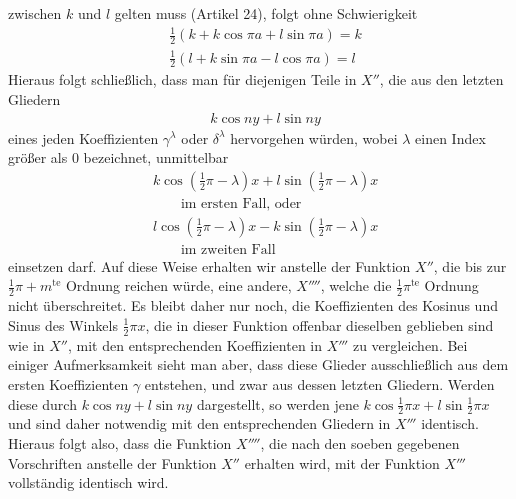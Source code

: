 zwischen $k$ und $l$ gelten muss (Artikel 24), folgt ohne Schwierigkeit
\[
\begin{aligned}
&\tfrac12(k+k\cos\pi a+l\sin\pi a)=k\\[5pt]
&\tfrac12(l+k\sin\pi a-l\cos\pi a)=l
\end{aligned}
\]
Hieraus folgt schließlich, dass man für diejenigen Teile in $X''$, die aus den letzten Gliedern
\[
\begin{aligned}
&k\cos ny+l\sin ny
\end{aligned}
\]
eines jeden Koeffizienten $\gamma^\lambda$ oder $\delta^\lambda$ hervorgehen würden,
wobei $\lambda$ einen Index größer als 0 bezeichnet, unmittelbar
\[
\begin{aligned}
&k\cos(\tfrac12\pi-\lambda)x+l\sin(\tfrac12\pi-\lambda)x\\[5pt]
&\qquad\text{im ersten Fall, oder}\\[5pt]
&l\cos(\tfrac12\pi-\lambda)x-k\sin(\tfrac12\pi-\lambda)x\\[5pt]
&\qquad\text{im zweiten Fall}
\end{aligned}
\]
einsetzen darf. Auf diese Weise erhalten wir anstelle der Funktion $X''$, die bis zur $\tfrac12\pi+m^{\mathrm{te}}$
Ordnung reichen würde, eine andere, $X''''$, welche die $\tfrac12\pi^{\mathrm{te}}$
Ordnung nicht überschreitet. Es bleibt daher nur noch, die Koeffizienten des Kosinus und Sinus des Winkels
$\tfrac12\pi x$, die in dieser Funktion offenbar dieselben geblieben sind wie in $X''$, mit
den entsprechenden Koeffizienten in $X'''$ zu vergleichen. Bei einiger Aufmerksamkeit
sieht man aber, dass diese Glieder ausschließlich aus dem ersten Koeffizienten $\gamma$ entstehen, und zwar
aus dessen letzten Gliedern. Werden diese durch $k\cos ny+l\sin ny$ dargestellt, so werden jene
$k\cos\tfrac12\pi x+l\sin\tfrac12\pi x$ und sind daher notwendig mit den entsprechenden Gliedern in
$X'''$ identisch. Hieraus folgt also, dass die Funktion $X''''$, die nach den
soeben gegebenen Vorschriften anstelle der Funktion $X''$ erhalten wird, mit der Funktion $X'''$
vollständig identisch wird.

\endgroup
